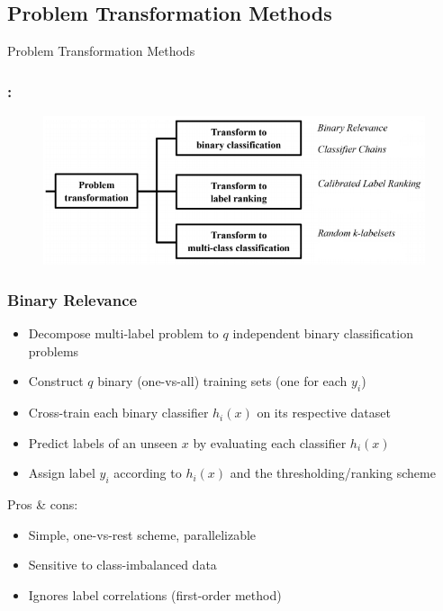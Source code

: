 \documentclass{beamer}
\begin{document}
\subsection{Problem Transformation Methods}
\begin{frame}
\Huge{\centerline{Problem Transformation Methods}}
\end{frame}
\begin{frame}
\frametitle{\insertsection : \insertsubsection}
\begin{figure}
\begin{center}
\includegraphics[scale = 0.7]{images/pt.png}
\end{center}
\end{figure}
\end{frame}
\begin{frame}
\frametitle{Binary Relevance}

\begin{itemize}
\item Decompose multi-label problem to $q$ independent binary classification problems
\item Construct $q$ binary (one-vs-all) training sets (one for each $y_i$)
\item Cross-train each binary classifier $h_i(x)$ on its respective dataset

\item Predict labels of an unseen $x$ by evaluating each classifier $h_i(x)$
\item Assign label $y_i$ according to $h_i(x)$ and the thresholding/ranking scheme 
\end{itemize}

Pros \& cons:
\begin{itemize}
\item Simple, one-vs-rest scheme, parallelizable
\item Sensitive to class-imbalanced data
\item Ignores label correlations (first-order method)
\end{itemize}

\end{frame}
\end{document}
